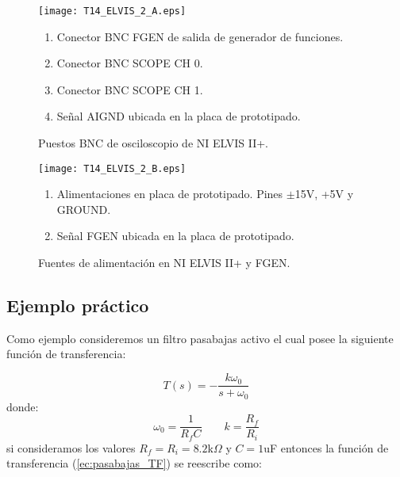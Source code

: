 	\begin{figure}[!ht]
		\begin{minipage}[c]{0.65\textwidth}
			\begin{center}
				\caption{Puestos BNC de osciloscopio de NI ELVIS II+.}
				\label{fig:T14_ELVIS_2_A}
				\texttt{[image: T14\_ELVIS\_2\_A.eps]}
			\end{center}
		\end{minipage} \hfill \begin{minipage}[c]{0.3\textwidth}
			\begin{enumerate}
		  		\item Conector BNC FGEN de salida de generador de funciones.
				\item Conector BNC SCOPE CH 0.
				\item Conector BNC SCOPE CH 1.
				\item Señal AIGND ubicada en la placa de prototipado.
			\end{enumerate}
		\end{minipage}
	\end{figure}
	
	\begin{figure}[!ht]
		\begin{minipage}[c]{0.65\textwidth}
			\begin{center}
				\caption{Fuentes de alimentación en NI ELVIS II+ y FGEN.}
				\label{fig:T14_ELVIS_2_B}
				\texttt{[image: T14\_ELVIS\_2\_B.eps]}
			\end{center}
		\end{minipage} \hfill \begin{minipage}[c]{0.3\textwidth}
			\begin{enumerate}
		  		\item Alimentaciones en placa de prototipado. Pines $\pm$15V, +5V y GROUND.
		  		\item Señal FGEN ubicada en la placa de prototipado.
			\end{enumerate}
		\end{minipage}
	\end{figure}
	
		\subsection{Ejemplo práctico}
	Como ejemplo consideremos un filtro pasabajas activo el cual posee la siguiente función de transferencia:
	
	\begin{equation}
		T(s) = - \frac{k \omega_{0}}{s + \omega_{0}}
		\label{ec:pasabajas_TF}
	\end{equation}
	donde:
	\begin{equation}
		\omega_{0} = \frac{1}{R_{f} C} \qquad k = \frac{R_{f}}{R_{i}}
	\end{equation}
	si consideramos los valores $R_{f} = R_{i}= 8.2$k$\Omega$ y $C = 1$uF entonces la función de transferencia (\ref{ec:pasabajas_TF}) se reescribe como:
	
